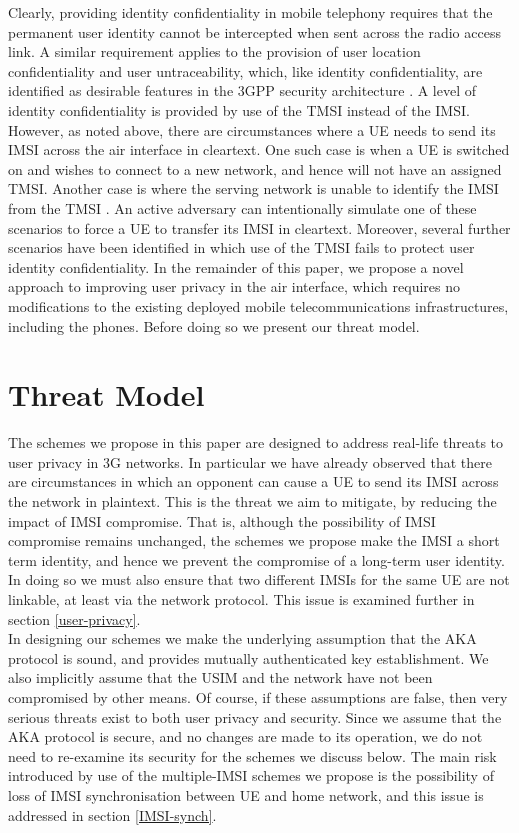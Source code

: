 \documentclass{acm_proc_article-sp}
\begin{document}
Clearly, providing identity confidentiality in mobile telephony requires that the permanent user identity cannot be intercepted when sent across the radio access link. A similar requirement applies to the provision of user location confidentiality and user untraceability, which, like identity confidentiality, are identified as desirable features in the 3GPP security architecture  \cite{3GPP_TS_33_102}. A level of identity confidentiality is provided by use of the TMSI instead of the IMSI. However, as noted above, there are circumstances where a UE needs to send its IMSI across the air interface in cleartext. One such case is when a UE is switched on and wishes to connect to a new network, and hence will not have an assigned TMSI. Another case is where the serving network is unable to identify the IMSI from the TMSI \cite{ETSI_TS_133_102:2013}. An active adversary can intentionally simulate one of these scenarios to force a UE to transfer its IMSI in cleartext. Moreover, several further scenarios have been identified  \cite{Arapinis12,ETSI_TS_121_133:2001,LTE-AN_Vintila_2011} in which use of the TMSI fails to protect user identity confidentiality. In the remainder of this paper, we propose a novel approach to improving user privacy in the air interface, which requires no modifications to the existing deployed mobile telecommunications infrastructures, including the phones. Before doing so we present our threat model.


\section{Threat Model} \label{PTM}

The schemes we propose in this paper are designed to address real-life threats to user privacy in 3G networks. In particular we have already observed that there are circumstances in which an opponent can cause a UE to send its IMSI across the network in plaintext. This is the threat we aim to mitigate, by reducing the impact of IMSI compromise. That is, although the possibility of IMSI compromise remains unchanged, the schemes we propose make the IMSI a short term identity, and hence we prevent the compromise of a long-term user identity. In doing so we must also ensure that two different IMSIs for the same UE are not linkable, at least via the network protocol. This issue is examined further in section \ref{user-privacy}. \\

In designing our schemes we make the underlying assumption that the AKA protocol is sound, and provides mutually authenticated key establishment. We also implicitly assume that the USIM and the network have not been compromised by other means. Of course, if these assumptions are false, then very serious threats exist to both user privacy and security. Since we assume that the AKA protocol is secure, and no changes are made to its operation, we do not need to re-examine its security for the schemes we discuss below. The main risk introduced by use of the multiple-IMSI schemes we propose is the possibility of loss of IMSI synchronisation between UE and home network, and this issue is addressed in section \ref{IMSI-synch}. \\
\end{document}
